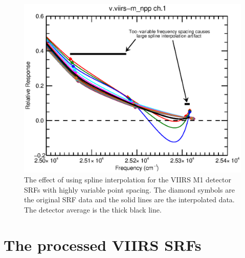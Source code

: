 \begin{figure}[H]
  \centering
  \includegraphics[bb= 0 15 400 300,clip,scale=0.75]{graphics/v.viirs-m_npp-ch1_interp.eps}
  \caption{The effect of using spline interpolation for the VIIRS M1 detector SRFs with highly variable point spacing. The diamond symbols are the original SRF data and the solid lines are the interpolated data. The detector average is the thick black line.}
  \label{fig:vis_no_spline}
\end{figure}


\newpage
\section{The processed VIIRS SRFs}
